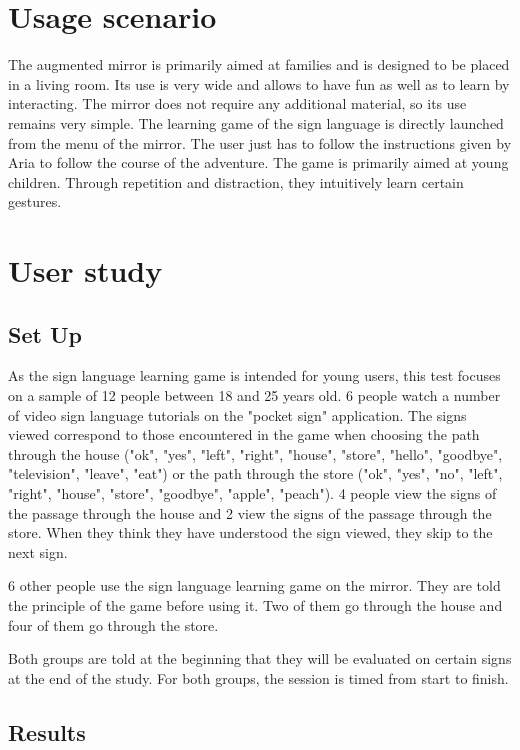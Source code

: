 \section{Usage scenario}

The augmented mirror is primarily aimed at families and is designed to be placed in a living room. Its use is very wide and allows to have fun as well as to learn by interacting.
The mirror does not require any additional material, so its use remains very simple.
The learning game of the sign language is directly launched from the menu of the mirror. The user just has to follow the instructions given by Aria to follow the course of the adventure. The game is primarily aimed at young children. Through repetition and distraction, they intuitively learn certain gestures.

\section{User study}

\subsection{Set Up}

As the sign language learning game is intended for young users, this test focuses on a sample of 12 people between 18 and 25 years old.
6 people watch a number of video sign language tutorials on the "pocket sign" application. The signs viewed correspond to those encountered in the game when choosing the path through the house ("ok", "yes", "left", "right", "house", "store", "hello", "goodbye", "television", "leave", "eat") or the path through the store ("ok", "yes", "no", "left", "right", "house", "store", "goodbye", "apple", "peach"). 4 people view the signs of the passage through the house and 2 view the signs of the passage through the store.
When they think they have understood the sign viewed, they skip to the next sign. 

6 other people use the sign language learning game on the mirror. They are told the principle of the game before using it. Two of them go through the house and four of them go through the store.

Both groups are told at the beginning that they will be evaluated on certain signs at the end of the study. 
For both groups, the session is timed from start to finish.

\subsection{Results}

